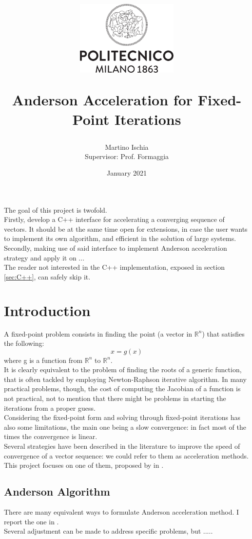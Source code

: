 \documentclass[12pt]{article}
\title{
		\vspace{-30mm}\begin{figure}[h]
			\centering
			\includegraphics[width=2in]{logo_polimi.png}
		\end{figure}Anderson Acceleration for Fixed-Point Iterations}
\author{Martino Ischia\\ \footnotesize{Supervisor: Prof. Formaggia}}
\date{January 2021}
\begin{document}
		\maketitle
		\abstract
			The goal of this project is twofold.\\
			Firstly, develop a C++ interface for accelerating a converging sequence of vectors.
			It should be at the same time open for extensions, in case the user wants to implement its own algorithm,
			and efficient in the solution of large systems.\\
			Secondly, making use of said interface to implement Anderson acceleration strategy and apply it on ...\\
			
			The reader not interested in the C++ implementation, exposed in section \ref{sec:C++},
			can safely skip it.
		\endabstract
		\tableofcontents
		
		\section{Introduction}
			A fixed-point problem consists in finding the point (a vector in $\mathbb{R}^n$) that satisfies the
			following:
			$$ x = g(x)$$
			where g is a function from $\mathbb{R}^n$ to $\mathbb{R}^n$.\\
			It is clearly equivalent to the problem of finding the roots of a generic function,
			that is often tackled by employing Newton-Raphson iterative algorithm.
			In many practical problems, though, the cost of computing the Jacobian of a function
			is not practical, not to mention that there might be problems in starting the
			iterations from a proper guess.\\
			Considering the fixed-point form and solving through fixed-point iterations has also some limitations, the main one being
			a slow convergence: in fact most of the times the convergence is linear.\\
			Several strategies have been described in the literature to improve the speed
			of convergence of a vector sequence: we could refer to them as acceleration methods.
			This project focuses on one of them,
			proposed by \citeauthor{Anderson} \cite{Anderson} in \citeyear{Anderson}.
			
			\subsection{Anderson Algorithm}
				There are many equivalent ways to formulate Anderson acceleration method.
				I report the one in \citeauthor{Walker} \cite{Walker}.\\
				Several adjustment can be made to address specific problems, but .....
				
\end{document}

